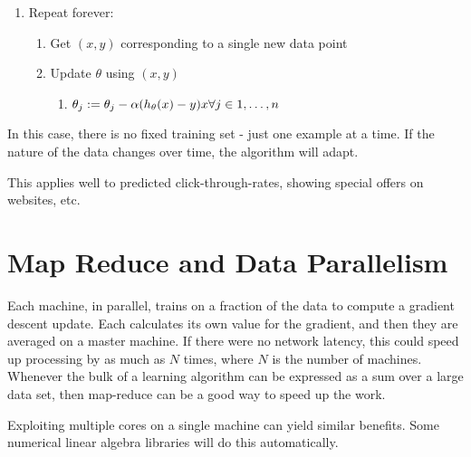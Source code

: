 \begin{enumerate}
    \item Repeat forever:
    \begin{enumerate}
        \item Get $(x,y)$ corresponding to a single new data point
        \item Update $\theta$ using $(x,y)$
        \begin{enumerate}
            \item $\theta_j := \theta_j - \alpha (h_\theta(x) - y)x \forall j \in {1,\dots,n}$
        \end{enumerate}
    \end{enumerate}
\end{enumerate}

In this case, there is no fixed training set - just one example at a time.
If the nature of the data changes over time, the algorithm will adapt.

This applies well to predicted click-through-rates, showing special offers on websites, etc.

\section{Map Reduce and Data Parallelism}

Each machine, in parallel, trains on a fraction of the data to compute a gradient descent update.
Each calculates its own value for the gradient, and then they are averaged on a master machine.
If there were no network latency, this could speed up processing by as much as $N$ times,
where $N$ is the number of machines.
Whenever the bulk of a learning algorithm can be expressed as a sum over a large data set,
then map-reduce can be a good way to speed up the work.

Exploiting multiple cores on a single machine can yield similar benefits.
Some numerical linear algebra libraries will do this automatically.